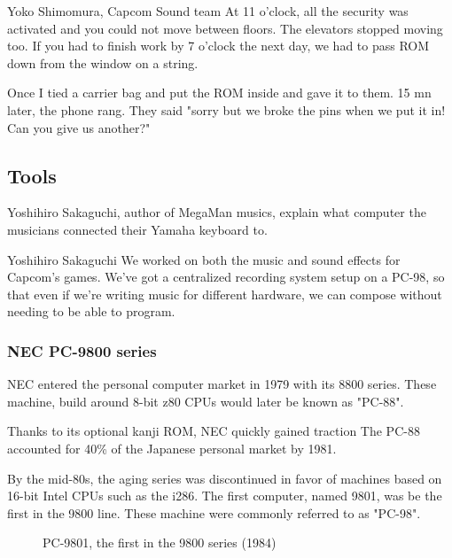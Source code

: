 \begin{q}{Yoko Shimomura, Capcom Sound team\cite{sf2musicsecurity}}
At 11 o'clock, all the security was activated and you could not move between floors. The elevators stopped moving too. If you had to finish work by 7 o'clock the next day, we had to pass ROM down from the window on a string.

Once I tied a carrier bag and put the ROM inside and gave it to them. 15 mn later, the phone rang. They said "sorry but we broke the pins when we put it in! Can you give us another?"
\end{q}



\subsection{Tools}
Yoshihiro Sakaguchi, author of MegaMan musics, explain what computer the musicians connected their Yamaha keyboard to.

\begin{q}{Yoshihiro Sakaguchi\cite{yoko_shimomura_interview}  }
We worked on both the music and sound effects for Capcom’s games. We’ve got a centralized recording system setup on a PC-98, so that even if we’re writing music for different hardware, we can compose without needing to be able to program.
\end{q}

\subsubsection{NEC PC-9800 series}

NEC entered the personal computer market in 1979 with its 8800 series. These machine, build around 8-bit z80 CPUs would later be known as "PC-88". 

Thanks to its optional kanji ROM, NEC quickly gained traction The PC-88 accounted for 40\% of the Japanese personal market by 1981.

By the mid-80s, the aging series was discontinued in favor of machines based on 16-bit Intel CPUs such as the i286. The first computer, named 9801, was be the first in the 9800 line. These machine were commonly referred to as "PC-98".

\begin{figure}[H]

\caption*{PC-9801, the first in the 9800 series (1984)}
\end{figure}

